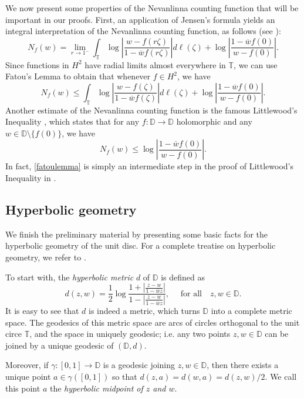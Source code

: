 \documentclass[11pt, reqno]{amsart}
\theoremstyle{definition}
\numberwithin{equation}{section}
\newcommand{\D}{\mathbb{D}}
\newcommand{\T}{\mathbb{T}}
\renewcommand{\leq}{\leqslant}
\begin{document}
We now present some properties of the Nevanlinna counting function that will be important in our proofs. First, an application of Jensen's formula yields an integral interpretation of the Nevanlinna counting function, as follows (see \cite[p. 187]{Sh1993}):
\[
N_f(w) = \lim_{r\to1^-}\int_{\T}\log\left\lvert \frac{w-f(r\zeta)}{1-\overline{w}f(r\zeta)}\right\rvert d\ell(\zeta) + \log\left\lvert\frac{1-\overline{w}f(0)}{w-f(0)}\right\rvert.
\]
Since functions in $H^2$ have radial limits almost everywhere in $\T$, we can use Fatou's Lemma to obtain that whenever $f\in H^2$, we have
\begin{equation}\label{fatoulemma}
N_f(w) \leq \int_{\T}\log\left\lvert \frac{w-f(\zeta)}{1-\overline{w}f(\zeta)}\right\rvert d\ell(\zeta) + \log\left\lvert\frac{1-\overline{w}f(0)}{w-f(0)}\right\rvert.
\end{equation}
Another estimate of the Nevanlinna counting function is the famous Littlewood's Inequality \cite[p.187]{Sh1993}, which states that for any $f\colon \D\to\D$ holomorphic and any $w\in\D\setminus \{f(0)\}$, we have
\begin{equation}\label{eq: littlewood ineq}
N_f(w)\leq \log\left\lvert \frac{ 1-\overline{w}f(0)}{w-f(0)}\right\rvert. 
\end{equation}
In fact, \eqref{fatoulemma} is simply an intermediate step in the proof of Littlewood's Inequality in \cite[p.187]{Sh1993}.



\subsection{Hyperbolic geometry} We finish the preliminary material by presenting some basic facts for the hyperbolic geometry of the unit disc. For a complete treatise on hyperbolic geometry, we refer to \cite[Chapter 1]{Ab2023}.

To start with, the \emph{hyperbolic metric} $d$ of $\D$ is defined as 
\[
d(z,w)=\frac{1}{2}\log \frac{1+\left\lvert\frac{z-w}{1-\overline{w}z}\right\rvert}{1-\left\lvert\frac{z-w}{1-\overline{w}z}\right\rvert}, \quad \text{ for all}\quad z,w\in\D.
\]
It is easy to see that $d$ is indeed a metric, which turns $\D$ into a complete metric space. The geodesics of this metric space are arcs of circles orthogonal to the unit circe $\T$, and the space in uniquely geodesic; i.e. any two points $z,w\in\D$ can be joined by a unique geodesic of $(\D,d)$. 

Moreover, if $\gamma\colon[0,1]\to\D$ is a geodesic joining $z,w\in\D$, then there exists a unique point $a\in\gamma([0,1])$ so that 
$d(z,a)=d(w,a)=d(z,w)/2$. We call this point $a$ the \emph{hyperbolic midpoint of $z$ and $w$}.
\end{document}
